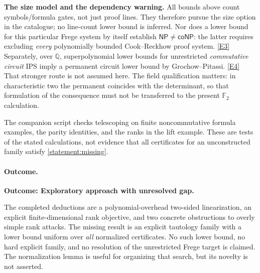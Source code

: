 \documentclass[11pt,a4paper]{article}
\newcommand{\Q}{\mathbb{Q}}
\newcommand{\eref}[2]{\hyperlink{extra:#1:#2}{[E#2]}}
\numberwithin{equation}{section}
\begin{document}
\textbf{The size model and the dependency warning.}
All bounds above count symbols/formula gates, not just proof lines. They
therefore pursue the size option in the catalogue; no line-count lower bound
is inferred. Nor does a lower bound for this particular Frege system by
itself establish $\mathsf{NP}\ne\mathsf{coNP}$: the latter requires excluding
\emph{every} polynomially bounded Cook--Reckhow proof system.
\eref{statement}{3} Separately, over $\Q$, superpolynomial lower bounds for unrestricted
\emph{commutative circuit} IPS imply a permanent circuit lower bound by
Grochow--Pitassi. \eref{statement}{4} That stronger route is not assumed here.
The field qualification matters: in characteristic two the permanent
coincides with the determinant, so that formulation of the consequence
must not be transferred to the present $\mathbb F_2$ calculation.

The companion script checks telescoping on finite noncommutative formula
examples, the parity identities, and the ranks in the lift example. These
are tests of the stated calculations, not evidence that all certificates
for an unconstructed family satisfy \eqref{statement:missing}.

\paragraph{Outcome.}
\textbf{Outcome: Exploratory approach with unresolved gap.}

The completed deductions are a polynomial-overhead two-sided linearization,
an explicit finite-dimensional rank objective, and two concrete obstructions
to overly simple rank attacks. The missing result is an explicit tautology
family with a lower bound uniform over \emph{all} normalized certificates.
No such lower bound, no hard explicit family, and no resolution of the
unrestricted Frege target is claimed. The normalization lemma is useful for
organizing that search, but its novelty is not asserted.
\end{document}
